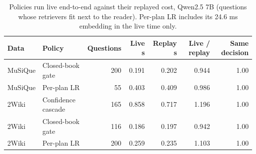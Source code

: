 \begin{table}[t]
\centering\small
\setlength{\tabcolsep}{4pt}
\caption{Policies run live end-to-end against their replayed cost, Qwen2.5 7B (questions whose retrievers fit next to the reader). Per-plan LR includes its 24.6 ms embedding in the live time only.}
\label{tab:robust_latency_policies}
\begin{tabular*}{\linewidth}{@{\extracolsep{\fill}}llrrrrr}
\toprule
Data & Policy & Questions & Live s & Replay s & Live / replay & Same decision \\
\midrule
MuSiQue & Closed-book gate & 200 & 0.191 & 0.202 & 0.944 & 1.00 \\
MuSiQue & Per-plan LR & 55 & 0.403 & 0.409 & 0.986 & 1.00 \\
2Wiki & Confidence cascade & 165 & 0.858 & 0.717 & 1.196 & 1.00 \\
2Wiki & Closed-book gate & 116 & 0.186 & 0.197 & 0.942 & 1.00 \\
2Wiki & Per-plan LR & 200 & 0.259 & 0.235 & 1.103 & 1.00 \\
\bottomrule
\end{tabular*}
\end{table}
